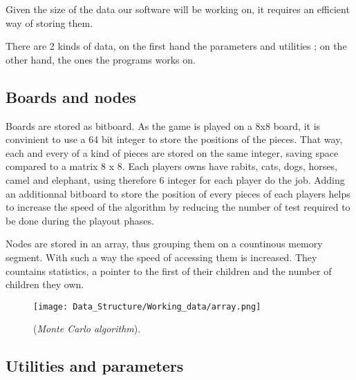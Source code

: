 Given the size of the data our software will be working on, it requires an efficient way of storing them.

There are 2 kinds of data, on the first hand the parameters and utilities ; on the other hand, the ones the programs works on.
\subsection{Boards and nodes}
Boards are stored as bitboard. As the game is played on a 8x8 board, it is convinient to use a 64 bit integer to store the positions of the pieces.
That way, each and every of a kind of pieces are stored on the same integer, saving space compared to a matrix 8 x 8.
Each players owns have rabits, cats, dogs, horses, camel and elephant, using therefore 6 integer for each player do the job. Adding an additionnal bitboard to store the position of every pieces of each players helps to increase the speed of the algorithm by reducing the number of test required to be done during the playout phases.

Nodes are stored in an array, thus grouping them on a countinous memory segment. With such a way the speed of accessing them is increased.
They countains statistics, a pointer to the first of their children and the number of children they own.

\begin{figure}[!h] 
\centerline{\texttt{[image: Data\_Structure/Working\_data/array.png]}}
\caption{\label{fig:array}(\textit{Monte Carlo algorithm}).}
\end{figure}


\subsection{Utilities and parameters}
